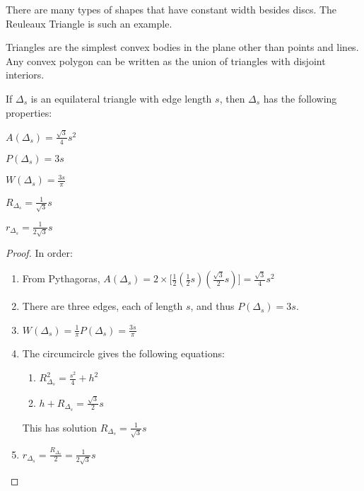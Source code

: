 \documentclass[crop=false,class=article,oneside]{standalone}
\begin{document}
        \begin{remark}
        There are many types of shapes that have constant width besides discs. The Reuleaux Triangle is such an example.
        \end{remark}
        Triangles are the simplest convex bodies in the plane other than points and lines. Any convex polygon can be written as the union of triangles with disjoint interiors. 
        \begin{theorem}
        If $\Delta_s$ is an equilateral triangle with edge length $s$, then $\Delta_s$ has the following properties:
        \begin{enumerate}
        \begin{multicols}{5}
        \item $A(\Delta_s) = \frac{\sqrt{3}}{4}s^2$
        \item $P(\Delta_s) = 3s$
        \item $W(\Delta_s) = \frac{3s}{\pi}$
        \item $R_{\Delta_s} = \frac{1}{\sqrt{3}}s$
        \item $r_{\Delta_s} = \frac{1}{2\sqrt{3}}s$
        \end{multicols}
        \end{enumerate}
        \end{theorem}
        \begin{proof}
        In order:
        \begin{enumerate}
            \item From Pythagoras, $A(\Delta_s) =2\times\big[\frac{1}{2}(\frac{1}{2}s)(\frac{\sqrt{3}}{2}s)\big] = \frac{\sqrt{3}}{4}s^2$
            \item There are three edges, each of length $s$, and thus $P(\Delta_s) = 3s$.
            \item $W(\Delta_s) = \frac{1}{\pi}P(\Delta_s) = \frac{3s}{\pi}$
            \item The circumcircle gives the following equations:
            \begin{enumerate}
                \item $R_{\Delta_s}^2=\frac{s^2}{4}+h^2$
                \item $h+R_{\Delta_s} = \frac{\sqrt{3}}{2}s$
            \end{enumerate}
            This has solution $R_{\Delta_s}=\frac{1}{\sqrt{3}}s$
            \item $r_{\Delta_s} = \frac{R_{\Delta_s}}{2}= \frac{1}{2\sqrt{3}}s$
        \end{enumerate}
        \end{proof}
\end{document}
